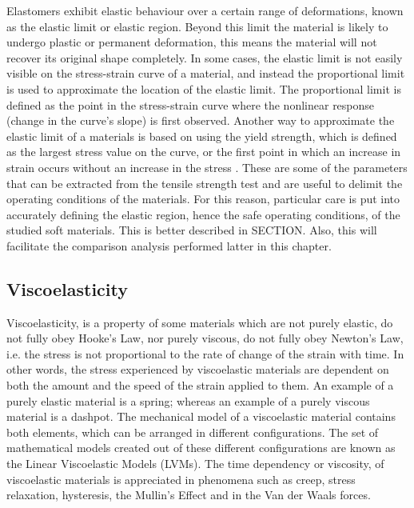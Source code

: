 Elastomers exhibit elastic behaviour over a certain range of deformations, known as the elastic limit or elastic region. Beyond this limit the material is likely to undergo plastic or permanent deformation, this means the material will not recover its original shape completely. In some cases, the elastic limit is not easily visible on the stress-strain curve of a material, and instead the proportional limit is used to approximate the location of the elastic limit. The proportional limit is defined as the point in the stress-strain curve where the nonlinear response (change in the curve's slope) is first observed. Another way to approximate the elastic limit of a materials is based on using the yield strength, which is defined as the largest stress value on the curve, or the first point in which an increase in strain occurs without an increase in the stress \cite{ebewele2000}. These are some of the parameters that can be extracted from the tensile strength test and are useful to delimit the operating conditions of the materials. For this reason, particular care is put into accurately defining the elastic region, hence the safe operating conditions, of the studied soft materials. This is better described in SECTION. Also, this will facilitate the comparison analysis performed latter in this chapter.

\subsection{Viscoelasticity}

Viscoelasticity, is a property of some materials which are not purely elastic, do not fully obey Hooke's Law, nor purely viscous, do not fully obey Newton's Law, i.e. the stress is not proportional to the rate of change of the strain with time. In other words, the stress experienced by viscoelastic materials are dependent on both the amount and the speed of the strain applied to them. An example of a purely elastic material is a spring; whereas an example of a purely viscous material is a dashpot. The mechanical model of a viscoelastic material contains both elements, which can be arranged in different configurations. The set of mathematical models created out of these different configurations are known as the Linear Viscoelastic Models (LVMs). The time dependency or viscosity, of viscoelastic materials is appreciated in phenomena such as creep, stress relaxation, hysteresis, the Mullin's Effect and in the Van der Waals forces.


